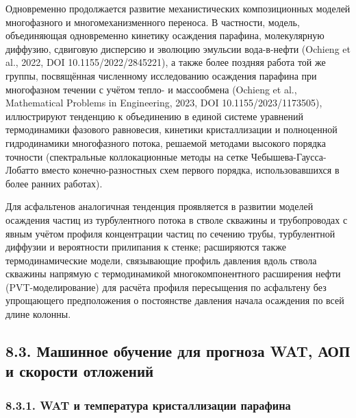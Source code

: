 \documentclass[11pt]{extarticle}
\begin{document}
Одновременно продолжается развитие механистических композиционных моделей многофазного и многомеханизменного переноса. В частности, модель, объединяющая одновременно кинетику осаждения парафина, молекулярную диффузию, сдвиговую дисперсию и эволюцию эмульсии вода-в-нефти (Ochieng et al., 2022, DOI 10.1155/2022/2845221), а также более поздняя работа той же группы, посвящённая численному исследованию осаждения парафина при многофазном течении с учётом тепло- и массообмена (Ochieng et al., Mathematical Problems in Engineering, 2023, DOI 10.1155/2023/1173505), иллюстрируют тенденцию к объединению в единой системе уравнений термодинамики фазового равновесия, кинетики кристаллизации и полноценной гидродинамики многофазного потока, решаемой методами высокого порядка точности (спектральные коллокационные методы на сетке Чебышева-Гаусса-Лобатто вместо конечно-разностных схем первого порядка, использовавшихся в более ранних работах).

Для асфальтенов аналогичная тенденция проявляется в развитии моделей осаждения частиц из турбулентного потока в стволе скважины и трубопроводах с явным учётом профиля концентрации частиц по сечению трубы, турбулентной диффузии и вероятности прилипания к стенке; расширяются также термодинамические модели, связывающие профиль давления вдоль ствола скважины напрямую с термодинамикой многокомпонентного расширения нефти (PVT-моделирование) для расчёта профиля пересыщения по асфальтену без упрощающего предположения о постоянстве давления начала осаждения по всей длине колонны.

\subsection{8.3. Машинное обучение для прогноза WAT, АОП и скорости отложений}\label{ux43cux430ux448ux438ux43dux43dux43eux435-ux43eux431ux443ux447ux435ux43dux438ux435-ux434ux43bux44f-ux43fux440ux43eux433ux43dux43eux437ux430-wat-ux430ux43eux43f-ux438-ux441ux43aux43eux440ux43eux441ux442ux438-ux43eux442ux43bux43eux436ux435ux43dux438ux439}

\subsubsection{8.3.1. WAT и температура кристаллизации парафина}\label{wat-ux438-ux442ux435ux43cux43fux435ux440ux430ux442ux443ux440ux430-ux43aux440ux438ux441ux442ux430ux43bux43bux438ux437ux430ux446ux438ux438-ux43fux430ux440ux430ux444ux438ux43dux430}
\end{document}
